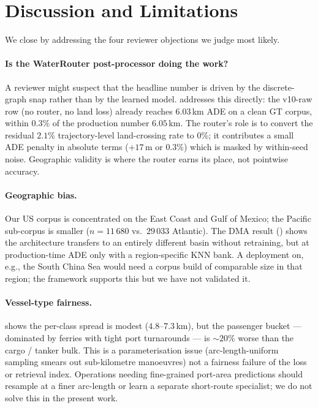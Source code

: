 \documentclass[11pt]{article}
\begin{document}
\section{Discussion and Limitations}
\label{sec:discussion}

We close by addressing the four reviewer objections we judge most
likely.

\paragraph{Is the WaterRouter post-processor doing the work?} A
reviewer might suspect that the headline number is driven by the
discrete-graph snap rather than by the learned model. 
addresses this directly: the v10-raw row (no router, no land loss)
already reaches $6.03$\,km ADE on a clean GT corpus, within $0.3$\%
of the production number $6.05$\,km. The router's role is to convert
the residual $2.1$\% trajectory-level land-crossing rate to $0$\%; it
contributes a small ADE penalty in absolute terms ($+17$\,m or
$0.3$\%) which is masked by within-seed noise. Geographic validity is
where the router earns its place, not pointwise accuracy.

\paragraph{Geographic bias.} Our US corpus is concentrated on the
East Coast and Gulf of Mexico; the Pacific sub-corpus is smaller
($n=11\,680$ vs.\ $29\,033$ Atlantic). The DMA result
() shows the architecture transfers to an
entirely different basin without retraining, but at production-time
ADE only with a region-specific KNN bank. A deployment on, e.g., the
South China Sea would need a corpus build of comparable size in that
region; the framework supports this but we have not validated it.

\paragraph{Vessel-type fairness.}  shows
the per-class spread is modest ($4.8$--$7.3$\,km), but the passenger
bucket --- dominated by ferries with tight port turnarounds --- is
$\sim$$20$\% worse than the cargo / tanker bulk. This is a
parameterisation issue (arc-length-uniform sampling smears out
sub-kilometre manoeuvres) not a fairness failure of the loss or
retrieval index. Operations needing fine-grained port-area
predictions should resample at a finer arc-length or learn a separate
short-route specialist; we do not solve this in the present work.
\end{document}
